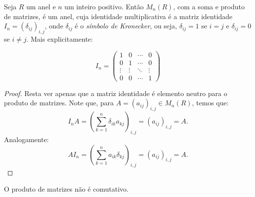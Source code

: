 \begin{proposition}
    Seja $R$ um anel e $n$ um inteiro positivo.
    Então $M_n(R)$, com a soma e produto de matrizes, é um anel, cuja identidade multiplicativa é a matriz identidade $I_n=(\delta_{ij})_{i, j}$, onde $\delta_{ij}$ é o \emph{símbolo de Kronecker}, ou seja, $\delta_{ij}=1$ se $i=j$ e $\delta_{ij}=0$ se $i\neq j$.
    Mais explicitamente:

    \begin{equation*}
        I_n = \begin{pmatrix}
            1 & 0 & \cdots & 0 \\
            0 & 1 & \cdots & 0 \\
            \vdots & \vdots & \ddots & \vdots \\
            0 & 0 & \cdots & 1
        \end{pmatrix}
    \end{equation*}
\end{proposition}
\begin{proof}
    Resta ver apenas que a matriz identidade é elemento neutro para o produto de matrizes.
    Note que, para $A=(a_{ij})_{i, j}\in M_n(R)$, temos que:
    \begin{equation*}
        I_n A = \left( \sum_{k=1}^n \delta_{ik} a_{kj} \right)_{i, j}=\left( a_{ij} \right)_{i, j}=A.
    \end{equation*}
    Analogamente:
    \begin{equation*}
        A I_n = \left( \sum_{k=1}^n a_{ik} \delta_{kj} \right)_{i, j}=\left( a_{ij} \right)_{i, j}=A.
    \end{equation*}
\end{proof}

O produto de matrizes não é comutativo.

